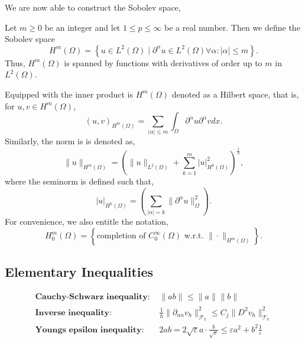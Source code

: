 We are now able to construct the Sobolev space,

\begin{definition}
    \label{def:sobolev_spaces}
    Let $m\ge 0$ be an integer and let $1 \le  p \le  \infty$ be a real number. Then we define the Sobolev space
\[
H^{m}\left( \Omega  \right) = \left\{ u \in L^{2}\left( \Omega  \right)  \mid  \partial ^{\alpha } u \in L^{2}\left( \Omega  \right)  \forall \alpha : \left\lvert \alpha  \right\rvert  \le m \right\}.
\]
Thus, $H^{m}( \Omega ) $ is spanned by functions with derivatives of order up to $m$ in $L^{2}( \Omega ) $.
\end{definition}
Equipped with the inner product is $H^{m}\left( \Omega  \right) $  denoted as a Hilbert space, that is, for $u,v \in H^{m}\left( \Omega  \right) $, \[
    \left( u,v \right) _{H^{m}\left( \Omega   \right) } = \sum_{\left\lvert \alpha  \right\rvert  \le  m}^{}  \int_{\Omega }^{} \partial ^{\alpha } u \partial ^{\alpha } v dx.
\]
Similarly, the norm is is denoted as, \[
\| u \|_{ H^{m}\left( \Omega  \right)  }^{  }  = \left( \| u \|_{ L^{2}\left( \Omega  \right)    } + \sum_{k = 1}^{m}  \left\lvert u \right\rvert ^{2} _{  H^{k}\left( \Omega  \right) }\right) ^{\frac{1}{2}},
\]
where the seminorm is defined such that, \[
\left\lvert u \right\rvert _{H^{k}\left( \Omega  \right) } = \left( \sum_{\left\lvert \alpha  \right\rvert  = k}^{} \| \partial ^{\alpha }u \|_{ \Omega  }^{ 2 }  \right).
\]
For convenience, we also entitle the notation,
\[
H^{m}_{0} \left( \Omega  \right) = \left\{ \text{completion of }C_{0}^{\infty}\left( \Omega  \right) \text{ w.r.t. } \| \cdot  \|_{H^{m}\left( \Omega  \right)   }^{  }  \right\}.
\]



\subsection{Elementary Inequalities}%
\label{sub:elementary_inequalities}
\[
\begin{split}
    \textbf{Cauchy-Schwarz inequality: } & \| ab \|_{  }^{  }  \le \| a \|_{  }^{  } \| b \|_{  }^{  }   \\
    \textbf{Inverse inequality: } & \frac{1}{h}\| \partial _{nn}  v_{h} \|_{\mathcal{F}_{h}   }^{2  }  \le C_{j} \| D ^2 v_{h} \|_{ \mathcal{T} _{h} }^{ 2 }   \\
    \textbf{Youngs epsilon inequality: } & 2ab =   2\sqrt{\varepsilon }a\cdot    \frac{b}{\sqrt{\varepsilon } } \le \varepsilon a^2+ b^2 \frac{1}{\varepsilon }
\end{split}
\]


